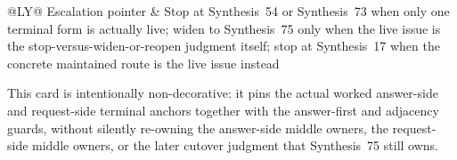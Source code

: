 \documentclass[11pt]{article}
\begin{document}
\begin{table}[t]
\begin{tabularx}{\linewidth}{@{}LY@{}}
Escalation pointer & Stop at Synthesis~54 or Synthesis~73 when only one terminal form is actually live; widen to Synthesis~75 only when the live issue is the stop-versus-widen-or-reopen judgment itself; stop at Synthesis~17 when the concrete maintained route is the live issue instead \\
\bottomrule
\end{tabularx}
\caption{A minimal public paired-terminal card. This is the smallest public answer later terse papers can quote directly when the live issue is that one already-valid answer-side terminal stop and one already-valid adjacent request-side terminal capstone may travel together as one ordered two-part reference.}
\label{tab:minimal-public-paired-terminal-card}
\end{table}

This card is intentionally non-decorative: it pins the actual worked answer-side and request-side terminal anchors together with the answer-first and adjacency guards, without silently re-owning the answer-side middle owners, the request-side middle owners, or the later cutover judgment that Synthesis~75 still owns.\cite{series:workedexample}
\end{document}
